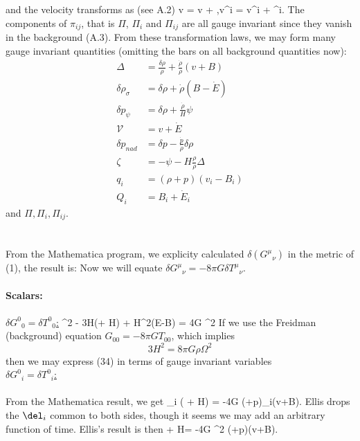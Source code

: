 \documentclass[10pt,letterpaper]{article}
\begin{document}
and the velocity transforms as (see A.2)
\be
	\tilde v = v + \dot \ep,\quad \tilde v^i = v^i + \dot \ep^i.
\ee
The components of $\pi_{ij}$, that is $\Pi$, $\Pi_i$ and $\Pi_{ij}$ are all gauge invariant since they vanish in the background (A.3). From these transformation laws, we may form many gauge invariant quantities (omitting the bars on all background quantities now):
\begin{align}
	\Delta &= \frac{\delta \rho}{\rho} + \frac{\dot \rho}{\rho}(v+B)\\
	\delta \rho_\sigma &= \delta \rho + \dot\rho(B-\dot E)\\
	\delta p_\psi &= \delta \rho + \frac{\dot \rho}{H}\psi\\
	\mathcal V &= v+\dot E\\
	\delta p_{nad} &= \delta p - \frac{\dot p}{\dot \rho} \delta \rho\\
	\zeta&= -\psi - H\frac{\rho}{\dot \rho}\Delta\\
	q_i &= (\rho+p)(v_i-B_i)\\
	Q_i &= B_i + \dot E_i
\end{align}
and $\Pi, \Pi_i, \Pi_{ij}$. 
\\ \\ \\
From the Mathematica program, we explicity calculated $\delta (G^\mu{}_\nu)$ in the metric of (1), the result is:
Now we will equate $\delta G^\mu{}_\nu = -8\pi G \delta T^\mu{}_\nu$.
\\ \\
\textbf{Scalars:}
\\
\\
\underline{$\delta G^0{}_0 = \delta T^0{}_0$:}
\be
	 \del^2 \psi - 3H(\dot \psi + H\phi) + H\del^2(\dot E-B) = 4\pi G \Omega^2 \delta \rho 
\ee
If we use the Freidman (background) equation $G_{00} = -8\pi G T_{00}$, which implies
\[
	3H^2 = 8\pi G \rho \Omega^2
\]
then we may express (34) in terms of gauge invariant variables
\be
\ee
\\
\underline{$\delta G^0{}_i = \delta T^0{}_i$:}
\\ \\
From the Mathematica result, we get
\be
	\del_i ( \dot \psi + H\phi) = -4\pi G (\rho+p)\del_i(v+B).
\ee
Ellis drops the $\del_i$ common to both sides, though it seems we may add an arbitrary function of time. Ellis's result is then
\be
	\dot \psi + H\phi = -4\pi G \Omega^2 (\rho+p)(v+B).
\end{document}

